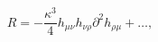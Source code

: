 \begin{equation}
R=-\frac{\kappa^3}4h_{\mu\nu}h_{\nu\rho}\partial^2h_{\rho\mu}+\ldots,
\end{equation}

